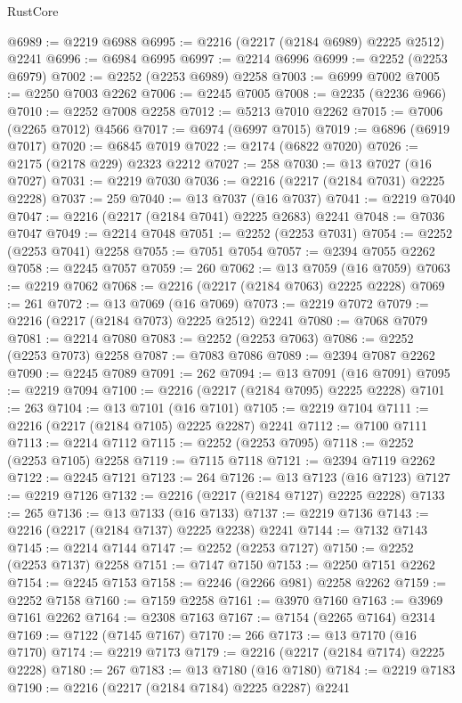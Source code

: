 \begin{lexlean}{RustCore}
\begin{coremodule}
@6989 := @2219 @6988
@6995 := @2216 (@2217 (@2184 @6989) @2225 @2512) @2241
@6996 := @6984 @6995
@6997 := @2214 @6996
@6999 := @2252 (@2253 @6979)
@7002 := @2252 (@2253 @6989) @2258
@7003 := @6999 @7002
@7005 := @2250 @7003 @2262
@7006 := @2245 @7005
@7008 := @2235 (@2236 @966)
@7010 := @2252 @7008 @2258
@7012 := @5213 @7010 @2262
@7015 := @7006 (@2265 @7012) @4566
@7017 := @6974 (@6997 @7015)
@7019 := @6896 (@6919 @7017)
@7020 := @6845 @7019
@7022 := @2174 (@6822 @7020)
@7026 := @2175 (@2178 @229) @2323 @2212
@7027 := 258
@7030 := @13 @7027 (@16 @7027)
@7031 := @2219 @7030
@7036 := @2216 (@2217 (@2184 @7031) @2225 @2228)
@7037 := 259
@7040 := @13 @7037 (@16 @7037)
@7041 := @2219 @7040
@7047 := @2216 (@2217 (@2184 @7041) @2225 @2683) @2241
@7048 := @7036 @7047
@7049 := @2214 @7048
@7051 := @2252 (@2253 @7031)
@7054 := @2252 (@2253 @7041) @2258
@7055 := @7051 @7054
@7057 := @2394 @7055 @2262
@7058 := @2245 @7057
@7059 := 260
@7062 := @13 @7059 (@16 @7059)
@7063 := @2219 @7062
@7068 := @2216 (@2217 (@2184 @7063) @2225 @2228)
@7069 := 261
@7072 := @13 @7069 (@16 @7069)
@7073 := @2219 @7072
@7079 := @2216 (@2217 (@2184 @7073) @2225 @2512) @2241
@7080 := @7068 @7079
@7081 := @2214 @7080
@7083 := @2252 (@2253 @7063)
@7086 := @2252 (@2253 @7073) @2258
@7087 := @7083 @7086
@7089 := @2394 @7087 @2262
@7090 := @2245 @7089
@7091 := 262
@7094 := @13 @7091 (@16 @7091)
@7095 := @2219 @7094
@7100 := @2216 (@2217 (@2184 @7095) @2225 @2228)
@7101 := 263
@7104 := @13 @7101 (@16 @7101)
@7105 := @2219 @7104
@7111 := @2216 (@2217 (@2184 @7105) @2225 @2287) @2241
@7112 := @7100 @7111
@7113 := @2214 @7112
@7115 := @2252 (@2253 @7095)
@7118 := @2252 (@2253 @7105) @2258
@7119 := @7115 @7118
@7121 := @2394 @7119 @2262
@7122 := @2245 @7121
@7123 := 264
@7126 := @13 @7123 (@16 @7123)
@7127 := @2219 @7126
@7132 := @2216 (@2217 (@2184 @7127) @2225 @2228)
@7133 := 265
@7136 := @13 @7133 (@16 @7133)
@7137 := @2219 @7136
@7143 := @2216 (@2217 (@2184 @7137) @2225 @2238) @2241
@7144 := @7132 @7143
@7145 := @2214 @7144
@7147 := @2252 (@2253 @7127)
@7150 := @2252 (@2253 @7137) @2258
@7151 := @7147 @7150
@7153 := @2250 @7151 @2262
@7154 := @2245 @7153
@7158 := @2246 (@2266 @981) @2258 @2262
@7159 := @2252 @7158
@7160 := @7159 @2258
@7161 := @3970 @7160
@7163 := @3969 @7161 @2262
@7164 := @2308 @7163
@7167 := @7154 (@2265 @7164) @2314
@7169 := @7122 (@7145 @7167)
@7170 := 266
@7173 := @13 @7170 (@16 @7170)
@7174 := @2219 @7173
@7179 := @2216 (@2217 (@2184 @7174) @2225 @2228)
@7180 := 267
@7183 := @13 @7180 (@16 @7180)
@7184 := @2219 @7183
@7190 := @2216 (@2217 (@2184 @7184) @2225 @2287) @2241

\end{coremodule}
\end{lexlean}
